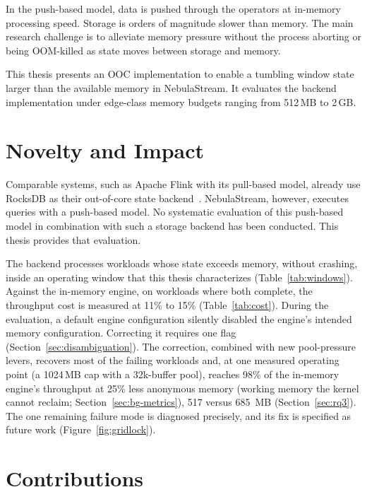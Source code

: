 In the push-based model, data is pushed through the operators at in-memory processing speed.
Storage is orders of magnitude slower than memory.
The main research challenge is to alleviate memory pressure without the process aborting or being OOM-killed as state moves between storage and memory.

This thesis presents an \ac{OOC} implementation to enable a tumbling window state larger than the available memory in NebulaStream.
It evaluates the backend implementation under edge-class memory budgets ranging from 512\,\ac{MB} to 2\,\ac{GB}.

\section{Novelty and Impact\label{sec:novelty}}

Comparable systems, such as Apache Flink with its pull-based model, already use RocksDB as their out-of-core state backend~\cite{flink2021,marcu2022}.
NebulaStream, however, executes queries with a push-based model.
No systematic evaluation of this push-based model in combination with such a storage backend has been conducted.
This thesis provides that evaluation.

The backend processes workloads whose state exceeds memory, without crashing, inside an operating window that this thesis characterizes (Table~\ref{tab:windows}).
Against the in-memory engine, on workloads where both complete, the throughput cost is measured at 11\% to 15\% (Table~\ref{tab:cost}).
During the evaluation, a default engine configuration silently disabled the engine's intended memory configuration.
Correcting it requires one flag (Section~\ref{sec:disambiguation}). 
The correction, combined with new pool-pressure levers, recovers most of the failing workloads and, at one measured operating point (a 1024\,MB cap with a 32k-buffer pool), reaches 98\% of the in-memory engine's throughput at 25\% less anonymous memory (working memory the kernel cannot reclaim; Section~\ref{sec:bg-metrics}), 517 versus 685\, MB (Section~\ref{sec:rq3}).
The one remaining failure mode is diagnosed precisely, and its fix is specified as future work (Figure~\ref{fig:gridlock}).

\section{Contributions\label{sec:contributions}}

